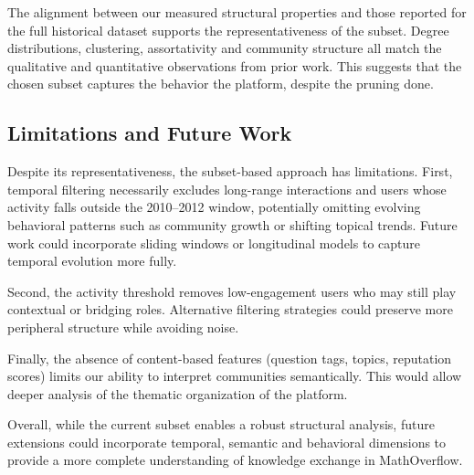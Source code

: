 \documentclass[sigplan]{acmart}
\begin{document}
        The alignment between our measured structural properties and those reported for the full historical dataset supports the representativeness of the subset.
        Degree distributions, clustering, assortativity and community structure all match the qualitative and quantitative observations from prior work. This suggests that the chosen subset captures the behavior the platform, despite the pruning done.
        
    \subsection{Limitations and Future Work}
        Despite its representativeness, the subset-based approach has limitations.
        First, temporal filtering necessarily excludes long-range interactions and users whose activity falls outside the 2010–2012 window, potentially omitting evolving behavioral patterns such as community growth or shifting topical trends. Future work could incorporate sliding windows or longitudinal models to capture temporal evolution more fully.
        
        Second, the activity threshold removes low-engagement users who may still play contextual or bridging roles. Alternative filtering strategies could preserve more peripheral structure while avoiding noise.
        
        Finally, the absence of content-based features (question tags, topics, reputation scores) limits our ability to interpret communities semantically. This would allow deeper analysis of the thematic organization of the platform.
        
        Overall, while the current subset enables a robust structural analysis, future extensions could incorporate temporal, semantic and behavioral dimensions to provide a more complete understanding of knowledge exchange in MathOverflow.        
\end{document}
